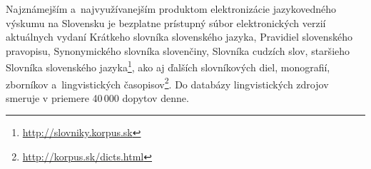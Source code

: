 \noindent Najznámejším a najvyužívanejším produktom
elektronizácie jazykovedného výskumu na Slovensku je bezplatne
prístupný súbor elektronických verzií aktuálnych vydaní Krátkeho
slovníka slovenského jazyka, Pravidiel slovenského pravopisu,
Synonymického slovníka slovenčiny, Slovníka cudzích slov,
staršieho Slovníka slovenského
jazyka\footnote{\url{http://slovniky.korpus.sk}}, ako aj ďalších
slovníkových diel, monografií, zborníkov a lingvistických
časopisov\footnote{\url{http://korpus.sk/dicts.html}}. Do databázy
lingvistických zdrojov smeruje v priemere 40\,000 dopytov denne.
